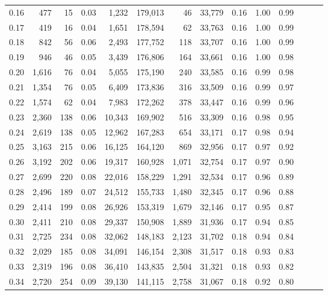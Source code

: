 \begin{tabular}{rrrrrrrrrrrrrr}
0.16 &    477 &     15 &  0.03 &    1,232 &  179,013 &      46 &  33,779 &  0.16 &  1.00 &      0.99 \\
0.17 &    419 &     16 &  0.04 &    1,651 &  178,594 &      62 &  33,763 &  0.16 &  1.00 &      0.99 \\
0.18 &    842 &     56 &  0.06 &    2,493 &  177,752 &     118 &  33,707 &  0.16 &  1.00 &      0.99 \\
0.19 &    946 &     46 &  0.05 &    3,439 &  176,806 &     164 &  33,661 &  0.16 &  1.00 &      0.98 \\
0.20 &  1,616 &     76 &  0.04 &    5,055 &  175,190 &     240 &  33,585 &  0.16 &  0.99 &      0.98 \\
0.21 &  1,354 &     76 &  0.05 &    6,409 &  173,836 &     316 &  33,509 &  0.16 &  0.99 &      0.97 \\
0.22 &  1,574 &     62 &  0.04 &    7,983 &  172,262 &     378 &  33,447 &  0.16 &  0.99 &      0.96 \\
0.23 &  2,360 &    138 &  0.06 &   10,343 &  169,902 &     516 &  33,309 &  0.16 &  0.98 &      0.95 \\
0.24 &  2,619 &    138 &  0.05 &   12,962 &  167,283 &     654 &  33,171 &  0.17 &  0.98 &      0.94 \\
0.25 &  3,163 &    215 &  0.06 &   16,125 &  164,120 &     869 &  32,956 &  0.17 &  0.97 &      0.92 \\
0.26 &  3,192 &    202 &  0.06 &   19,317 &  160,928 &   1,071 &  32,754 &  0.17 &  0.97 &      0.90 \\
0.27 &  2,699 &    220 &  0.08 &   22,016 &  158,229 &   1,291 &  32,534 &  0.17 &  0.96 &      0.89 \\
0.28 &  2,496 &    189 &  0.07 &   24,512 &  155,733 &   1,480 &  32,345 &  0.17 &  0.96 &      0.88 \\
0.29 &  2,414 &    199 &  0.08 &   26,926 &  153,319 &   1,679 &  32,146 &  0.17 &  0.95 &      0.87 \\
0.30 &  2,411 &    210 &  0.08 &   29,337 &  150,908 &   1,889 &  31,936 &  0.17 &  0.94 &      0.85 \\
0.31 &  2,725 &    234 &  0.08 &   32,062 &  148,183 &   2,123 &  31,702 &  0.18 &  0.94 &      0.84 \\
0.32 &  2,029 &    185 &  0.08 &   34,091 &  146,154 &   2,308 &  31,517 &  0.18 &  0.93 &      0.83 \\
0.33 &  2,319 &    196 &  0.08 &   36,410 &  143,835 &   2,504 &  31,321 &  0.18 &  0.93 &      0.82 \\
0.34 &  2,720 &    254 &  0.09 &   39,130 &  141,115 &   2,758 &  31,067 &  0.18 &  0.92 &      0.80 \\

\end{tabular}
